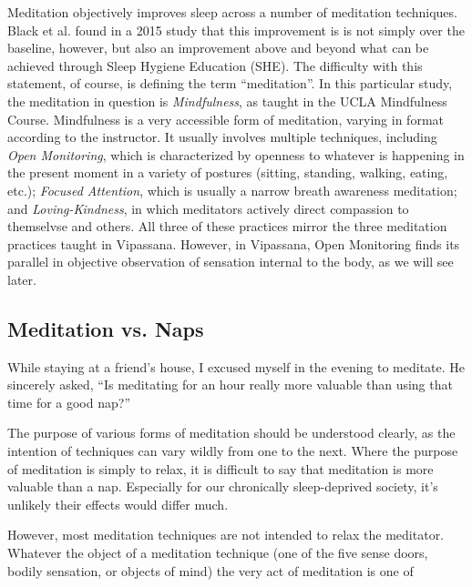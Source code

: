 \documentclass[a4paper, amsfonts, amssymb, amsmath, reprint, showkeys, nofootinbib, twoside]{revtex4-1}
\begin{document}
Meditation objectively improves sleep across a number of meditation techniques.
\cite{nagendra2012} Black et al. found in a 2015 study that this
improvement is is not simply over the baseline, however, but also an improvement
above and beyond what can be achieved through Sleep
Hygiene Education (SHE). \cite{black2015} The difficulty with this statement, of
course, is defining the term ``meditation''. In this particular study, the meditation
in question is \textit{Mindfulness}, as taught in the UCLA Mindfulness
Course. \cite{uclamaps} Mindfulness is a very accessible form of meditation, varying
in format according to the instructor. It usually involves multiple techniques,
including \textit{Open Monitoring}, which is characterized by
openness to whatever is happening in the present moment in a variety of postures
(sitting, standing, walking, eating, etc.); \textit{Focused Attention}, which is
usually a narrow breath awareness meditation; and \textit{Loving-Kindness}, in which
meditators actively direct compassion to themselvse and others. All three of these
practices mirror the three meditation practices taught in Vipassana. However, in Vipassana, Open
Monitoring finds its parallel in objective observation of sensation internal to the
body, as we will see later.


\subsection{Meditation vs. Naps}

While staying at a friend's house, I excused myself in the evening to meditate. He
sincerely asked, ``Is meditating for an hour really more valuable than using that
time for a good nap?''

The purpose of various forms of meditation should be understood clearly, as the
intention of techniques can vary wildly from one to the next. Where the purpose of
meditation is simply to relax, it is difficult to say that meditation is more
valuable than a nap. Especially for our chronically sleep-deprived society, it's
unlikely their effects would differ much.

However, most meditation techniques are not intended to relax the meditator. Whatever
the object of a meditation technique (one of the five sense doors, bodily sensation,
or objects of mind) the very act of meditation is one of

\end{document}
